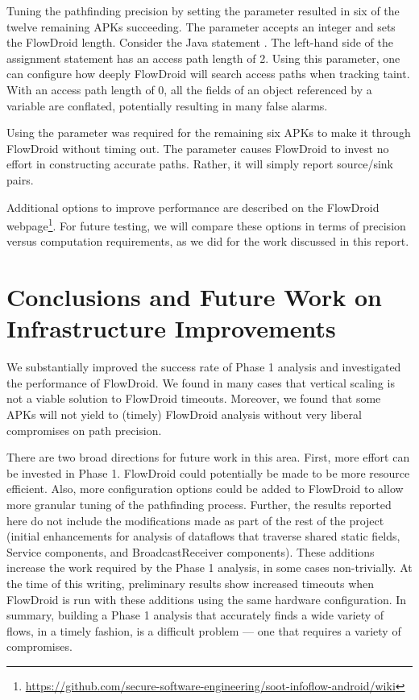 Tuning the pathfinding precision by setting the  parameter resulted in six of the twelve remaining APKs succeeding. The  parameter accepts an integer and sets the FlowDroid  length. Consider the Java statement . The left-hand side of the assignment statement has an access path length of 2. Using this parameter, one can configure how deeply FlowDroid will search access paths when tracking taint. With an access path length of 0, all the fields of an object referenced by a variable are conflated, potentially resulting in many false alarms.

Using the  parameter was required for the remaining six APKs to make it through FlowDroid without timing out. The  parameter causes FlowDroid to invest no effort in constructing accurate paths. Rather, it will simply report source/sink pairs. 

Additional options to improve performance are described on the FlowDroid webpage\footnote{\url{https://github.com/secure-software-engineering/soot-infoflow-android/wiki}}. For future testing, we will compare these options in terms of precision versus computation requirements, as we did for the work discussed in this report.


\section{Conclusions and Future Work on Infrastructure Improvements}
We substantially improved the success rate of Phase 1 analysis and investigated the performance of FlowDroid.  We found in many cases that vertical scaling is not a viable solution to FlowDroid timeouts.  Moreover, we found that some APKs will not yield to (timely) FlowDroid analysis without very liberal compromises on path precision.

There are two broad directions for future work in this area.  First, more effort can be invested in Phase 1.  FlowDroid could potentially be made to be more resource efficient.  Also, more configuration options could be added to FlowDroid to allow more granular tuning of the pathfinding process.  Further, the results reported here do not include the modifications made as part of the rest of the project (initial enhancements for analysis of dataflows that traverse shared static fields, Service components, and BroadcastReceiver components).  These additions increase the work required by the Phase 1 analysis, in some cases non-trivially.  At the time of this writing, preliminary results show increased timeouts when FlowDroid is run with these additions using the same hardware configuration.  In summary, building a Phase 1 analysis that accurately finds a wide variety of flows, in a timely fashion, is a difficult problem --- one that requires a variety of compromises. 

